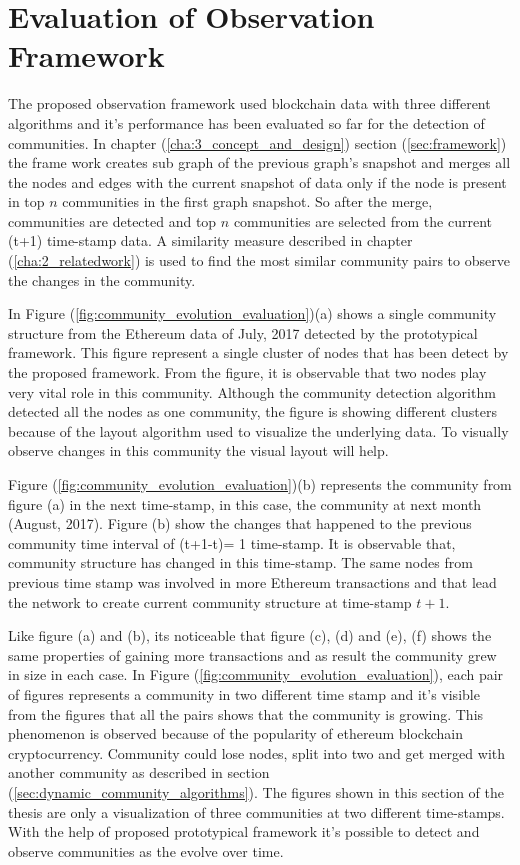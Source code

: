 \section{Evaluation of Observation Framework}
The proposed observation framework used blockchain data with three different algorithms and it's performance has been evaluated so far for the detection of communities. In chapter (\ref{cha:3_concept_and_design}) section (\ref{sec:framework}) the frame work creates sub graph of the previous graph's snapshot and merges all the nodes and edges with the current snapshot of data only if the node is present in top $n$ communities in the first graph snapshot. So after the merge, communities are detected and top $n$ communities are selected from the current (t+1) time-stamp data. A similarity measure described in chapter (\ref{cha:2_relatedwork}) is used to find the most similar community pairs to observe the changes in the community.

In Figure (\ref{fig:community_evolution_evaluation})(a) shows a single community structure from the Ethereum data of July, 2017 detected by the prototypical framework. This figure represent a single cluster of nodes that has been detect by the proposed framework. From the figure, it is observable that two nodes play very vital role in this community. Although the community detection algorithm detected all the nodes as one community, the figure is showing different clusters because of the layout algorithm used to visualize the underlying data. To visually observe changes in this community the visual layout will help.

Figure (\ref{fig:community_evolution_evaluation})(b) represents the community  from figure (a) in the next time-stamp, in this case, the community at next month (August, 2017). Figure (b) show the changes that happened to the previous community time interval of (t+1-t)= 1 time-stamp. It is observable that, community structure has changed in this time-stamp. The same nodes from previous time stamp was involved in more Ethereum transactions and that lead the network to create current community structure at time-stamp $t+1$.

Like figure (a) and (b), its noticeable that figure (c), (d) and (e), (f) shows the same properties of gaining more transactions and as result the community grew in size in each case. In Figure (\ref{fig:community_evolution_evaluation}), each pair of figures represents a community in two different time stamp and it's visible from the figures that all the pairs shows that the community is growing. This phenomenon is observed because of the popularity of ethereum blockchain cryptocurrency. Community could lose nodes, split into two and get merged with another community as described in section (\ref{sec:dynamic_community_algorithms}). The figures shown in this section of the thesis are only a visualization of three communities at two different time-stamps. With the help of proposed prototypical framework it's possible to detect and observe communities as the evolve over time.

